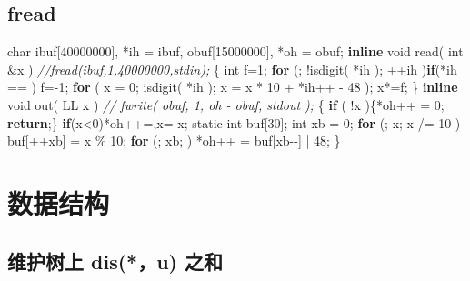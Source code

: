 \documentclass[
]{article}
\newenvironment{Shaded}{}{}
\newcommand{\AttributeTok}[1]{\textcolor[rgb]{0.49,0.56,0.16}{#1}}
\newcommand{\CharTok}[1]{\textcolor[rgb]{0.25,0.44,0.63}{#1}}
\newcommand{\CommentTok}[1]{\textcolor[rgb]{0.38,0.63,0.69}{\textit{#1}}}
\newcommand{\ControlFlowTok}[1]{\textcolor[rgb]{0.00,0.44,0.13}{\textbf{#1}}}
\newcommand{\DataTypeTok}[1]{\textcolor[rgb]{0.56,0.13,0.00}{#1}}
\newcommand{\DecValTok}[1]{\textcolor[rgb]{0.25,0.63,0.44}{#1}}
\newcommand{\KeywordTok}[1]{\textcolor[rgb]{0.00,0.44,0.13}{\textbf{#1}}}
\newcommand{\NormalTok}[1]{#1}
\begin{document}
\hypertarget{fread}{%
\subsection{fread}\label{fread}}

\begin{Shaded}
\begin{Highlighting}[]
\DataTypeTok{char}\NormalTok{ ibuf[}\DecValTok{40000000}\NormalTok{], *ih = ibuf, obuf[}\DecValTok{15000000}\NormalTok{], *oh = obuf;}
\KeywordTok{inline} \DataTypeTok{void}\NormalTok{ read( }\DataTypeTok{int}\NormalTok{ \&x ) }\CommentTok{//fread(ibuf,1,40000000,stdin);}
\NormalTok{\{}
    \DataTypeTok{int}\NormalTok{ f=}\DecValTok{1}\NormalTok{;}
    \ControlFlowTok{for}\NormalTok{ (; !isdigit( *ih ); ++ih )}\ControlFlowTok{if}\NormalTok{(*ih == }\CharTok{\textquotesingle{}{-}\textquotesingle{}}\NormalTok{) f={-}}\DecValTok{1}\NormalTok{;}
    \ControlFlowTok{for}\NormalTok{ ( x = }\DecValTok{0}\NormalTok{; isdigit( *ih ); x = x * }\DecValTok{10}\NormalTok{ + *ih++ {-} }\DecValTok{48}\NormalTok{ );}
\NormalTok{    x*=f;}
\NormalTok{\}}
\KeywordTok{inline} \DataTypeTok{void}\NormalTok{ out( LL x ) }\CommentTok{// fwrite( obuf, 1, oh {-} obuf, stdout );}
\NormalTok{\{}
    \ControlFlowTok{if}\NormalTok{ ( !x )\{*oh++ = }\CharTok{\textquotesingle{}0\textquotesingle{}}\NormalTok{; }\ControlFlowTok{return}\NormalTok{;\}}
    \ControlFlowTok{if}\NormalTok{(x\textless{}}\DecValTok{0}\NormalTok{)*oh++=}\CharTok{\textquotesingle{}{-}\textquotesingle{}}\NormalTok{,x={-}x;}
    \AttributeTok{static} \DataTypeTok{int}\NormalTok{ buf[}\DecValTok{30}\NormalTok{]; }\DataTypeTok{int}\NormalTok{ xb = }\DecValTok{0}\NormalTok{;}
    \ControlFlowTok{for}\NormalTok{ (; x; x /= }\DecValTok{10}\NormalTok{ )}
\NormalTok{        buf[++xb] = x \% }\DecValTok{10}\NormalTok{;}
    \ControlFlowTok{for}\NormalTok{ (; xb; )}
\NormalTok{        *oh++ = buf[xb{-}{-}] | }\DecValTok{48}\NormalTok{;}
\NormalTok{\}}
\end{Highlighting}
\end{Shaded}

\hypertarget{ux6570ux636eux7ed3ux6784}{%
\section{数据结构}\label{ux6570ux636eux7ed3ux6784}}

\hypertarget{ux7ef4ux62a4ux6811ux4e0a-disu-ux4e4bux548c}{%
\subsection{维护树上 dis(*，u)
之和}\label{ux7ef4ux62a4ux6811ux4e0a-disu-ux4e4bux548c}}
\end{document}
